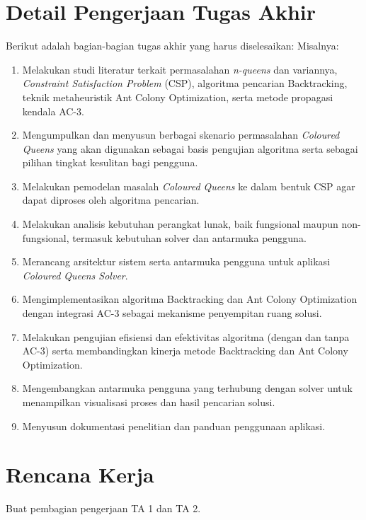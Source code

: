 \documentclass[12pt,a4paper]{article}
\begin{document}
	\section*{Detail Pengerjaan Tugas Akhir}
	Berikut adalah bagian-bagian tugas akhir yang harus diselesaikan: 
	Misalnya:
	\begin{enumerate}
		\item Melakukan studi literatur terkait permasalahan \textit{n-queens} dan variannya, \textit{Constraint Satisfaction Problem} (CSP), algoritma pencarian Backtracking, teknik metaheuristik Ant Colony Optimization, serta metode propagasi kendala AC-3.
		
		\item Mengumpulkan dan menyusun berbagai skenario permasalahan \textit{Coloured Queens} yang akan digunakan sebagai basis pengujian algoritma serta sebagai pilihan tingkat kesulitan bagi pengguna.
		
		\item Melakukan pemodelan masalah \textit{Coloured Queens} ke dalam bentuk CSP agar dapat diproses oleh algoritma pencarian.
		
		\item Melakukan analisis kebutuhan perangkat lunak, baik fungsional maupun non-fungsional, termasuk kebutuhan solver dan antarmuka pengguna.
		
		\item Merancang arsitektur sistem serta antarmuka pengguna untuk aplikasi \textit{Coloured Queens Solver}.
		
		\item Mengimplementasikan algoritma Backtracking dan Ant Colony Optimization dengan integrasi AC-3 sebagai mekanisme penyempitan ruang solusi.
		
		\item Melakukan pengujian efisiensi dan efektivitas algoritma (dengan dan tanpa AC-3) serta membandingkan kinerja metode Backtracking dan Ant Colony Optimization.
		
		\item Mengembangkan antarmuka pengguna yang terhubung dengan solver untuk menampilkan visualisasi proses dan hasil pencarian solusi.
		
		\item Menyusun dokumentasi penelitian dan panduan penggunaan aplikasi.
	\end{enumerate}
	
	\section*{Rencana Kerja}
	Buat pembagian pengerjaan TA 1 dan TA 2.
	
\end{document}
